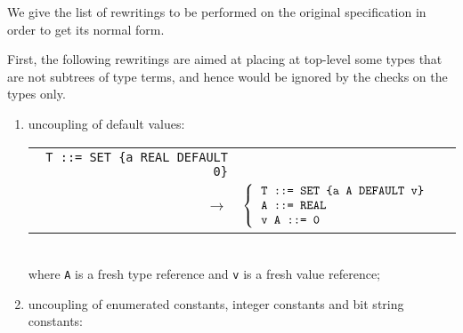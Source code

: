 
We give the list of rewritings to be performed on the original \ASN
specification in order to get its normal form. 

First, the following rewritings are aimed at placing at top-level some
types that are not subtrees of type terms, and hence would be ignored
by the checks on the types only.

\begin{enumerate}

  \item uncoupling of default values:

        \begin{tabular}{rcl} 
           \verb+T ::= SET {a REAL DEFAULT 0}+\\
             $\longrightarrow$
           & $\left\{
                \begin{tabular}{l}
                  \verb+T ::= SET {a A DEFAULT v}+\\
                  \verb+A ::= REAL+\\
                  \verb+v A ::= 0+
                \end{tabular}
              \right.$\\
        \end{tabular} \\
        where \texttt{A} is a fresh type reference and \texttt{v} is
        a fresh value reference;

  \item uncoupling of enumerated constants, integer constants and bit
        string constants:


\end{enumerate}
